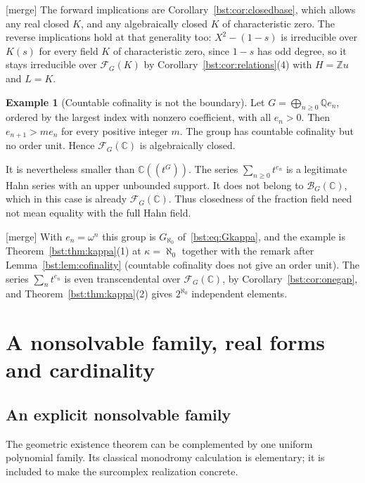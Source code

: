 \documentclass[11pt,letterpaper]{article}
\theoremstyle{definition}
\newtheorem{example}[theorem]{Example}
\theoremstyle{remark}
\newcommand{\Q}{\mathbb Q}
\newcommand{\C}{\mathbb C}
\newcommand{\Z}{\mathbb Z}
\newcommand{\HH}[2]{#1((t^{#2}))}
\newcommand{\BB}[2]{\mathcal B_{#2}(#1)}
\newcommand{\FF}[2]{\mathcal F_{#2}(#1)}
\begin{document}
\textup{[merge]} The forward implications are Corollary~\ref{bst:cor:closedbase},
which allows any real closed $K$, and any algebraically closed $K$ of
characteristic zero. The reverse implications hold at that generality too:
$X^2-(1-s)$ is irreducible over $K(s)$ for every field $K$ of characteristic
zero, since $1-s$ has odd degree, so it stays irreducible over $\FF KG$ by
Corollary~\ref{bst:cor:relations}(4) with $H=\Z u$ and $L=K$.

\begin{example}[Countable cofinality is not the boundary]\label{bst:gr:ex:countable}
Let $G=\bigoplus_{n\geq0}\Q e_n$, ordered by the largest index with nonzero
coefficient, with all $e_n>0$. Then $e_{n+1}>me_n$ for every positive integer
$m$. The group has countable cofinality but no order unit. Hence $\FF{\C}G$ is
algebraically closed.

It is nevertheless smaller than $\HH{\C}G$. The series $\sum_{n\geq0}t^{e_n}$
is a legitimate Hahn series with an upper unbounded support. It does not
belong to $\BB{\C}G$, which in this case is already $\FF{\C}G$. Thus
closedness of the fraction field need not mean equality with the full Hahn
field.
\end{example}

\textup{[merge]} With $e_n=\omega^n$ this group is $G_{\aleph_0}$
of~\eqref{bst:eq:Gkappa}, and the example is Theorem~\ref{bst:thm:kappa}(1) at
$\kappa=\aleph_0$ together with the remark after Lemma~\ref{bst:lem:cofinality}
(countable cofinality does not give an order unit). The series
$\sum_nt^{e_n}$ is even transcendental over $\FF{\C}G$, by
Corollary~\ref{bst:cor:onegap}, and Theorem~\ref{bst:thm:kappa}(2) gives
$2^{\aleph_0}$ independent elements.

\section{A nonsolvable family, real forms and cardinality}\label{bst:gr:sec:real}

\subsection{An explicit nonsolvable family}

The geometric existence theorem can be complemented by one uniform
polynomial family. Its classical monodromy calculation is elementary; it is
included to make the surcomplex realization concrete.
\end{document}
